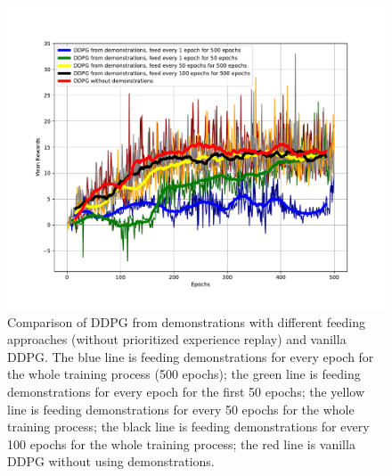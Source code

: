 \documentclass{article}
\begin{document}
\begin{figure}[htbp]
	\centering
	\includegraphics[scale=0.5]{img/ddpgfd1.pdf}
	\caption{Comparison of DDPG from demonstrations with different feeding approaches (without prioritized experience replay) and vanilla DDPG. The blue line is feeding demonstrations for every epoch for the whole training process (500 epochs); the green line is feeding demonstrations for every epoch for the first 50 epochs; the yellow line is feeding demonstrations for every 50 epochs for the whole training process; the black line is feeding demonstrations for every 100 epochs for the whole training process; the red line is vanilla DDPG without using demonstrations. }
	\label{fig:ddpgfd1}
\end{figure}



\medskip
 


\end{document}
